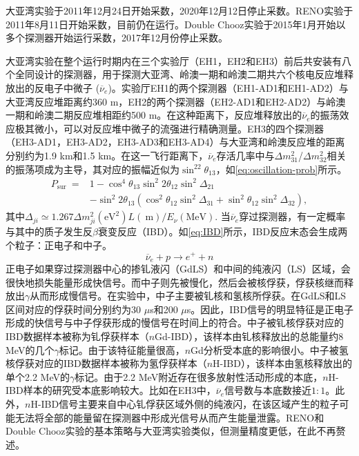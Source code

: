 \documentclass[a4paper,zihao=-4]{article}
\begin{document}
大亚湾实验于2011年12月24日开始采数，2020年12月12日停止采数。RENO实验于2011年8月11日开始采数，目前仍在运行。Double Chooz实验于2015年1月开始以多个探测器开始运行采数，2017年12月份停止采数。

大亚湾实验在整个运行时期内在三个实验厅（EH1，EH2和EH3）前后共安装有八个全同设计的探测器，用于探测大亚湾、岭澳一期和岭澳二期共六个核电反应堆释放出的反电子中微子 ($\overline{\nu}_e$)。实验厅EH1的两个探测器（EH1-AD1和EH1-AD2）与大亚湾反应堆距离约360 m，EH2的两个探测器（EH2-AD1和EH2-AD2）与岭澳一期和岭澳二期反应堆相距约500 m。在这种距离下，反应堆释放出的$\overline{\nu}_e$的振荡效应极其微小，可以对反应堆中微子的流强进行精确测量。EH3的四个探测器（EH3-AD1，EH3-AD2，EH3-AD3和EH3-AD4）与大亚湾和岭澳反应堆的距离分别约为1.9 km和1.5 km。在这一飞行距离下，$\overline{\nu}_e$存活几率中与$\Delta m_{31}^2$/$\Delta m_{32}^2$相关的振荡项成为主导，其对应的振幅近似为$\sin^22\theta_{13}$，如\cref{eq:oscillation-prob}所示。
\begin{equation}\label{eq:oscillation-prob}
	\begin{aligned}
P_{\text {sur }}= & 1-\cos ^4 \theta_{13} \sin ^2 2 \theta_{12} \sin ^2 \Delta_{21} \\
& -\sin ^2 2 \theta_{13}\left(\cos ^2 \theta_{12} \sin ^2 \Delta_{31}+\sin ^2 \theta_{12} \sin ^2 \Delta_{32}\right),
\end{aligned}
\end{equation}
其中$\Delta_{j i} \simeq 1.267 \Delta m_{j i}^2\left(\mathrm{eV}^2\right) L(\mathrm{~m}) / E_\nu(\mathrm{MeV})$. 
当$\overline{\nu}_e$穿过探测器，有一定概率与其中的质子发生反$\beta$衰变反应（IBD）。如\cref{eq:IBD}所示，IBD反应末态会生成两个粒子：正电子和中子。
\begin{equation}\label{eq:IBD}
	\overline{\nu}_e+p\to e^++n
\end{equation}
正电子如果穿过探测器中心的掺钆液闪（GdLS）和中间的纯液闪（LS）区域，会很快地损失能量形成快信号。而中子则先被慢化，然后会被核俘获，俘获核继而释放出$\gamma$从而形成慢信号。在实验中，中子主要被钆核和氢核所俘获。在GdLS和LS区间对应的俘获时间分别约为30 $\mu$s和200 $\mu$s。因此，IBD信号的明显特征是正电子形成的快信号与中子俘获形成的慢信号在时间上的符合。中子被钆核俘获对应的IBD数据样本被称为钆俘获样本（$n$Gd-IBD），该样本由钆核释放出的总能量约8 MeV的几个$\gamma$标记。由于该特征能量很高，$n$Gd分析受本底的影响很小。中子被氢核俘获对应的IBD数据样本被称为氢俘获样本（$n$H-IBD），该样本由氢核释放出的单个2.2 MeV的$\gamma$标记。由于2.2 MeV附近存在很多放射性活动形成的本底，$n$H-IBD样本的研究受本底影响较大。比如在EH3中，$\overline{\nu}_e$信号数与本底数接近$1:1$。此外，$n$H-IBD信号主要来自中心钆俘获区域外侧的纯液闪，在该区域产生的粒子可能无法将全部的能量留在探测器中形成光信号从而产生能量泄露。RENO和Double Chooz实验的基本策略与大亚湾实验类似，但测量精度更低，在此不再赘述。
\end{document}
